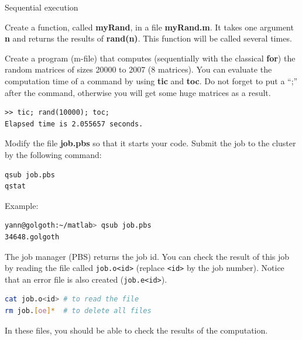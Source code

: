 \documentclass{emse-exo}
\begin{document}
\begin{question}{Sequential execution}
 \item Create a function, called \textbf{myRand}, in a file \textbf{myRand.m}. It takes one argument \textbf{n} and returns the results of \textbf{rand(n)}. This function will be called several times.
 \item Create a program (m-file) that computes (sequentially with the classical \textbf{for}) the random matrices of sizes 20000 to 2007 (8 matrices). You can evaluate the computation time of a command by using \textbf{tic} and \textbf{toc}. Do not forget to put a ``;'' after the command, otherwise you will get some huge matrices as a result.
\begin{lstlisting}
>> tic; rand(10000); toc;
Elapsed time is 2.055657 seconds.
\end{lstlisting}

 \item Modify the file \textbf{job.pbs} so that it starts your \matlabregistered{} code. Submit the job to the cluster by the following command:
\begin{lstlisting}[language=sh]
qsub job.pbs
qstat
\end{lstlisting}
Example:
\begin{lstlisting}[language=sh]
yann@golgoth:~/matlab> qsub job.pbs
34648.golgoth
\end{lstlisting}
The job manager (PBS) returns the job id. You can check the result of this job by reading the file called \verb!job.o<id>! (replace \verb!<id>! by the job number). Notice that an error file is also created (\verb!job.e<id>!).
\begin{lstlisting}[language=sh]
cat job.o<id> # to read the file
rm job.[oe]*  # to delete all files
\end{lstlisting}
In these files, you should be able to check the results of the computation.
\end{question}
\end{document}
